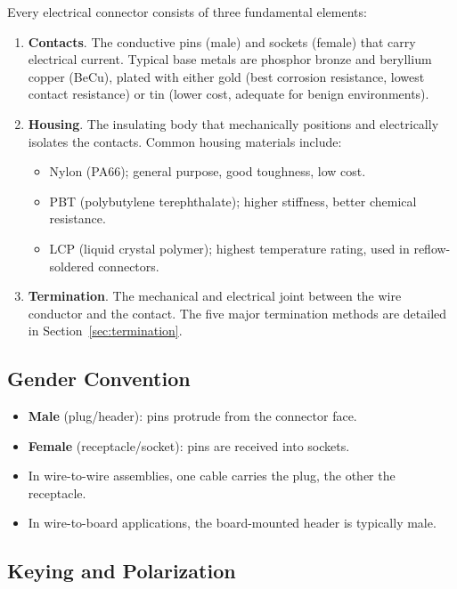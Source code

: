 \documentclass[11pt,letterpaper,twoside,openany]{book}
\begin{document}
Every electrical connector consists of three fundamental elements:

\begin{enumerate}[leftmargin=1.5em]
  \item \textbf{Contacts}. The conductive pins (male) and sockets (female) that carry electrical current. Typical base metals are phosphor bronze and beryllium copper (BeCu), plated with either gold (best corrosion resistance, lowest contact resistance) or tin (lower cost, adequate for benign environments).

  \item \textbf{Housing}. The insulating body that mechanically positions and electrically isolates the contacts. Common housing materials include:
  \begin{itemize}[nosep]
    \item Nylon (PA66); general purpose, good toughness, low cost.
    \item PBT (polybutylene terephthalate); higher stiffness, better chemical resistance.
    \item LCP (liquid crystal polymer); highest temperature rating, used in reflow-soldered connectors.
  \end{itemize}

  \item \textbf{Termination}. The mechanical and electrical joint between the wire conductor and the contact. The five major termination methods are detailed in Section~\ref{sec:termination}.
\end{enumerate}

\subsection{Gender Convention}

\begin{itemize}[leftmargin=1.5em]
  \item \textbf{Male} (plug/header): pins protrude from the connector face.
  \item \textbf{Female} (receptacle/socket): pins are received into sockets.
  \item In wire-to-wire assemblies, one cable carries the plug, the other the receptacle.
  \item In wire-to-board applications, the board-mounted header is typically male.
\end{itemize}

\subsection{Keying and Polarization}
\end{document}
